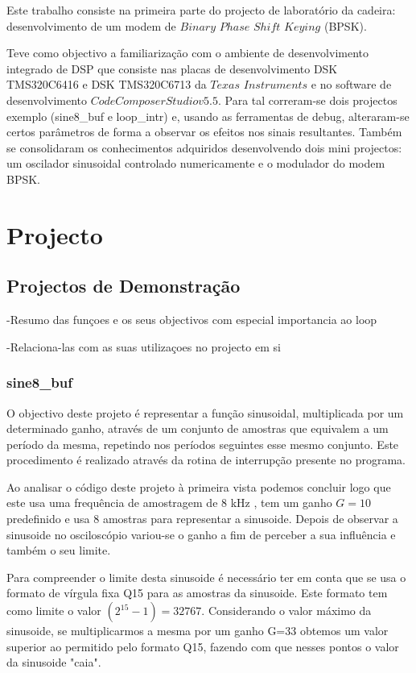 \documentclass[11pt]{article}
\begin{document}
Este trabalho consiste na primeira parte do projecto de laboratório da cadeira: desenvolvimento de um modem de $Binary$ $Phase$ $Shift$ $Keying$ (BPSK). 

Teve como objectivo a familiarização com o ambiente de desenvolvimento integrado de DSP que consiste nas placas de desenvolvimento DSK TMS320C6416 e DSK TMS320C6713 da $Texas$ $Instruments$ e no software de desenvolvimento $Code Composer Studio v5.5$. Para tal correram-se dois projectos exemplo (sine8\_buf e loop\_intr) e, usando as ferramentas de debug, alteraram-se certos parâmetros de forma a observar os efeitos nos sinais resultantes. Também se consolidaram os conhecimentos adquiridos desenvolvendo dois mini projectos: um oscilador sinusoidal controlado numericamente e o modulador do modem BPSK.

%
%

\section{Projecto}

\subsection{Projectos de Demonstração}
-Resumo das funçoes e os seus objectivos com especial importancia ao loop

-Relaciona-las com as suas utilizaçoes no projecto em si

\subsubsection{sine8\_buf}
\label{sec:sine8}
O objectivo deste projeto é representar a função sinusoidal, multiplicada por um determinado ganho, através de um conjunto de amostras que equivalem a um período da mesma, repetindo nos períodos seguintes esse mesmo conjunto. Este procedimento é realizado através da rotina de interrupção presente no programa. 

Ao analisar o código deste projeto à primeira vista podemos concluir logo que este usa uma frequência de amostragem de 8 kHz , tem um ganho $G=10$ predefinido e usa 8 amostras para representar a sinusoide. Depois de observar a sinusoide no osciloscópio variou-se o ganho a fim de perceber a sua influência e também o seu limite.
 
Para compreender o limite desta sinusoide é necessário ter em conta que se usa o formato de vírgula fixa Q15 para as amostras da sinusoide. Este formato tem como limite o valor $(2^{15}-1) = 32767$. Considerando o valor máximo da sinusoide, se multiplicarmos a mesma por um ganho G=33 obtemos um valor superior ao permitido pelo formato Q15, fazendo com que nesses pontos o valor da sinusoide "caia".     
\end{document}
